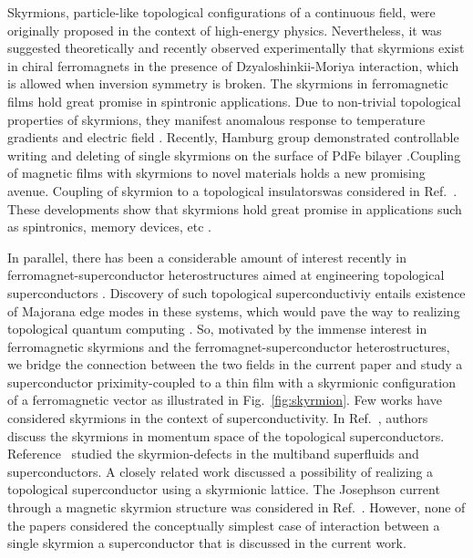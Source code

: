 \documentclass[twocolumn,showpacs,floatfix,nofootinbib,longbibliography]{revtex4-1}
\begin{document}
Skyrmions, particle-like topological configurations of a continuous field, were originally proposed in the context of high-energy physics.  Nevertheless, it was suggested theoretically \cite{Bogdanov1989,Rossler2006} and recently observed experimentally \cite{Muhlbauer2009,Munzer2010,Yu2011,Heinze2011,Seki2012} that skyrmions exist in chiral ferromagnets in the presence of Dzyaloshinkii-Moriya interaction, which is allowed when inversion symmetry is broken. The skyrmions in ferromagnetic films hold great promise in spintronic applications. Due to non-trivial topological properties of skyrmions, they manifest anomalous response to temperature gradients \cite{Jonietz2010} and electric field \cite{Neubauer2009}. Recently, Hamburg group demonstrated  controllable writing and deleting of single skyrmions on the surface of PdFe bilayer \cite{Romming2013,Bergmann2014,Romming2015}.Coupling of magnetic films with skyrmions to novel materials holds a new promising avenue.  Coupling of skyrmion to a topological insulatorswas considered in Ref.~\cite{Hurst2015}. These developments show that skyrmions hold great promise in applications such as spintronics, memory devices, etc \cite{Nagaosa2013}. 

In parallel, there has been a considerable amount of interest recently in ferromagnet-superconductor heterostructures aimed at engineering topological superconductors \cite{Alicea2012}. Discovery of such topological superconductiviy entails existence of Majorana edge modes in these systems, which would pave the way to realizing topological quantum computing \cite{Nayak2008}. So, motivated by the immense interest in ferromagnetic skyrmions and the ferromagnet-superconductor heterostructures, we bridge the connection between the two fields in the current paper and study a superconductor priximity-coupled to a thin film with a skyrmionic configuration of a ferromagnetic vector as illustrated in Fig.~\ref{fig:skyrmion}. Few works have considered skyrmions in the context of superconductivity. In Ref.~\cite{Bjornson2014}, authors discuss the skyrmions in momentum space of the topological superconductors. Reference~\cite{Garaud2011} studied the skyrmion-defects in the multiband superfluids and superconductors. A closely related work \cite{Nakosai2013} discussed a possibility of realizing a topological superconductor using a skyrmionic lattice. The Josephson current through a magnetic skyrmion structure was considered in Ref.~\cite{Yokoyama2015}. However, none of the papers considered the conceptually simplest case of interaction between a single skyrmion a superconductor that is discussed in the current work.
\end{document}
